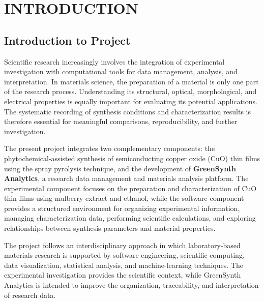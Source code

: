 \documentclass[12pt,a4paper,oneside]{report}
\begin{document}
{{{\tableofcontents{}
\thispagestyle{empty}
\listoffigures{}
\thispagestyle{empty}
\listoftables{}
\thispagestyle{empty}


\pagestyle{fancyplain}
\fancyhf{}
\fancyfoot[R]{\scriptsize{\thepage}}
\renewcommand{\headrulewidth}{0.0pt}
\renewcommand{\footrulewidth}{0.0pt}


\chapter{INTRODUCTION}

\section{Introduction to Project}

Scientific research increasingly involves the integration of experimental investigation with computational tools for data management, analysis, and interpretation. In materials science, the preparation of a material is only one part of the research process. Understanding its structural, optical, morphological, and electrical properties is equally important for evaluating its potential applications. The systematic recording of synthesis conditions and characterization results is therefore essential for meaningful comparisons, reproducibility, and further investigation.

The present project integrates two complementary components: the phytochemical-assisted synthesis of semiconducting copper oxide ($\text{CuO}$) thin films using the spray pyrolysis technique, and the development of \textbf{GreenSynth Analytics}, a research data management and materials analysis platform. The experimental component focuses on the preparation and characterization of $\text{CuO}$ thin films using mulberry extract and ethanol, while the software component provides a structured environment for organizing experimental information, managing characterization data, performing scientific calculations, and exploring relationships between synthesis parameters and material properties.

The project follows an interdisciplinary approach in which laboratory-based materials research is supported by software engineering, scientific computing, data visualization, statistical analysis, and machine-learning techniques. The experimental investigation provides the scientific context, while GreenSynth Analytics is intended to improve the organization, traceability, and interpretation of research data.

}}}
\end{document}

